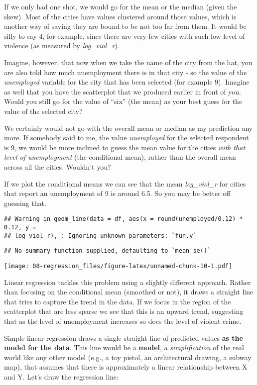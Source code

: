 \documentclass[
]{book}
\begin{document}
If we only had one shot, we would go for the mean or the median (given the skew). Most of the cities have values clustered around those values, which is another way of saying they are bound to be not too far from them. It would be silly to say 4, for example, since there are very few cities with such low level of violence (as measured by \emph{log\_viol\_r}).

Imagine, however, that now when we take the name of the city from the hat, you are also told how much unemployment there is in that city - so the value of the \emph{unemployed} variable for the city that has been selected (for example 9). Imagine as well that you have the scatterplot that we produced earlier in front of you. Would you still go for the value of ``six'' (the mean) as your best guess for the value of the selected city?

We certainly would not go with the overall mean or median as my prediction any more. If somebody said to me, the value \emph{unemployed} for the selected respondent is 9, we would be more inclined to guess the mean value for the cities \emph{with that level of unemployment} (the conditional mean), rather than the overall mean across all the cities. Wouldn't you?

If we plot the conditional means we can see that the mean \emph{log\_viol\_r} for cities that report an unemployment of 9 is around 6.5. So you may be better off guessing that.

\begin{verbatim}
## Warning in geom_line(data = df, aes(x = round(unemployed/0.12) * 0.12, y =
## log_viol_r), : Ignoring unknown parameters: `fun.y`
\end{verbatim}

\begin{verbatim}
## No summary function supplied, defaulting to `mean_se()`
\end{verbatim}

\texttt{[image: 08-regression\_files/figure-latex/unnamed-chunk-10-1.pdf]}

Linear regression tackles this problem using a slightly different approach. Rather than focusing on the conditional mean (smoothed or not), it draws a straight line that tries to capture the trend in the data. If we focus in the region of the scatterplot that are less sparse we see that this is an upward trend, suggesting that as the level of unemployment increases so does the level of violent crime.

Simple linear regression draws a single straight line of predicted values \textbf{as the model for the data}. This line would be a \textbf{model}, a \emph{simplification} of the real world like any other model (e.g., a toy pistol, an architectural drawing, a subway map), that assumes that there is approximately a linear relationship between X and Y. Let's draw the regression line:
\end{document}
